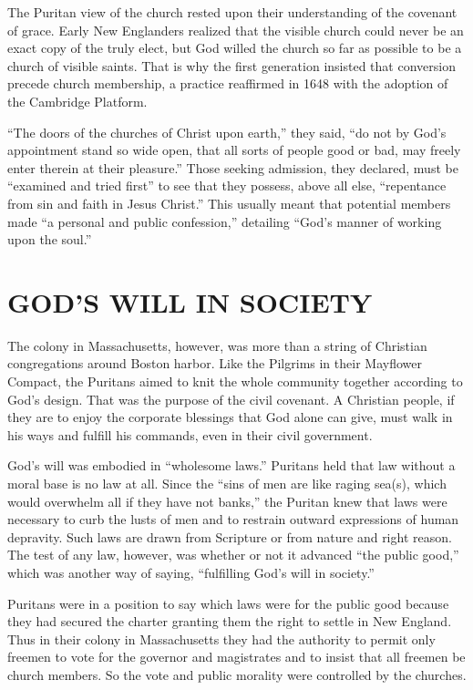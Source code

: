 The Puritan view of the church rested upon their understanding of the covenant of grace. Early New
Englanders realized that the visible church could never be an exact copy of the truly elect, but God
willed the church so far as possible to be a church of visible saints. That is why the first
generation insisted that conversion precede church membership, a practice reaffirmed in 1648 with
the adoption of the Cambridge Platform.

“The doors of the churches of Christ upon earth,” they said, “do not by God’s appointment stand so
wide open, that all sorts of people good or bad, may freely enter therein at their pleasure.” Those
seeking admission, they declared, must be “examined and tried first” to see that they possess, above
all else, “repentance from sin and faith in Jesus Christ.” This usually meant that potential members
made “a personal and public confession,” detailing “God’s manner of working upon the soul.”

\section{GOD’S WILL IN SOCIETY}

The colony in Massachusetts, however, was more than a string of Christian congregations around
Boston harbor. Like the Pilgrims in their Mayflower Compact, the Puritans aimed to knit the whole
community together according to God’s design. That was the purpose of the civil covenant. A
Christian people, if they are to enjoy the corporate blessings that God alone can give, must walk in
his ways and fulfill his commands, even in their civil government.

God’s will was embodied in “wholesome laws.” Puritans held that law without a moral base is no law
at all. Since the “sins of men are like raging sea(s), which would overwhelm all if they have not
banks,” the Puritan knew that laws were necessary to curb the lusts of men and to restrain outward
expressions of human depravity. Such laws are drawn from Scripture or from nature and right reason.
The test of any law, however, was whether or not it advanced “the public good,” which was another
way of saying, “fulfilling God’s will in society.”

Puritans were in a position to say which laws were for the public good because they had secured the
charter granting them the right to settle in New England. Thus in their colony in Massachusetts they
had the authority to permit only freemen to vote for the governor and magistrates and to insist that
all freemen be church members. So the vote and public morality were controlled by the churches.

